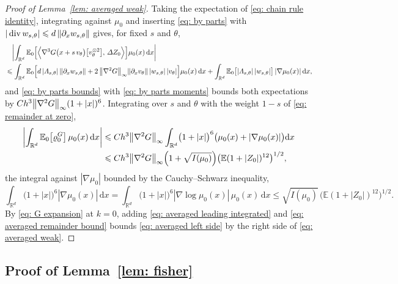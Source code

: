 \documentclass[namedate,webpdf,imanum]{ima-authoring-template}
\newcommand{\Le}{\leqslant}
\newcommand{\D}{\mathrm{d}}
\theoremstyle{thmstyletwo}
\numberwithin{equation}{section}
\begin{document}
\begin{proof}[Proof of Lemma~\ref{lem: averaged weak}]
    Taking the expectation of \eqref{eq: chain rule identity}, integrating against $\mu_0$ and inserting \eqref{eq: by parts} with $|\operatorname{div} w_{s,\theta}| \Le d\, \norm{\partial_x w_{s,\theta}}$ gives, for fixed $s$ and $\theta$,
    \begin{align*}
        & \quad \biggl| \int_{\mathbb R^d} \mathbb E_0 \Bigl[ \Bigl\langle \nabla^3 G\bigl( x + s\, v_\theta \bigr) \bigl[ v_\theta^{\otimes 2} \bigr] ,\, \Delta Z_0 \Bigr\rangle \Bigr] \mu_0(x)\,\D x \biggr| \\
        & \Le \int_{\mathbb R^d} \mathbb E_0 \Bigl[ d\, |\Lambda_{s,\theta}|\, \norm{\partial_x w_{s,\theta}} + 2\, \norm{\nabla^2 G}_\infty \norm{\partial_x v_\theta}\, |w_{s,\theta}|\, |v_\theta| \Bigr] \mu_0(x)\,\D x
        + \int_{\mathbb R^d} \mathbb E_0 \bigl[ |\Lambda_{s,\theta}|\, |w_{s,\theta}| \bigr]\, |\nabla \mu_0(x)|\,\D x ,
    \end{align*}
    and \eqref{eq: by parts bounds} with \eqref{eq: by parts moments} bounds both expectations by $C h^3 \norm{\nabla^2 G}_\infty ( 1 + |x| )^6$. Integrating over $s$ and $\theta$ with the weight $1 - s$ of \eqref{eq: remainder at zero},
    \begin{align}
        \biggl| \int_{\mathbb R^d} \mathbb E_0 \bigl[ \varrho_0^G \bigr]\, \mu_0(x)\,\D x \biggr|
        & \Le C h^3 \norm{\nabla^2 G}_\infty \int_{\mathbb R^d} \bigl( 1 + |x| \bigr)^6 \bigl( \mu_0(x) + |\nabla \mu_0(x)| \bigr) \D x \notag \\
        & \Le C h^3 \norm{\nabla^2 G}_\infty \Bigl( 1 + \sqrt{I(\mu_0)} \Bigr) \bigl( \mathbb E ( 1 + |Z_0| )^{12} \bigr)^{1/2} ,
        \label{eq: averaged remainder bound}
    \end{align}
    the integral against $|\nabla \mu_0|$ bounded by the Cauchy--Schwarz inequality,
    \begin{equation*}
        \int_{\mathbb R^d} \bigl( 1 + |x| \bigr)^6 |\nabla \mu_0(x)|\,\D x = \int_{\mathbb R^d} \bigl( 1 + |x| \bigr)^6 |\nabla \log \mu_0(x)|\, \mu_0(x)\,\D x \Le \sqrt{I(\mu_0)}\, \bigl( \mathbb E ( 1 + |Z_0| )^{12} \bigr)^{1/2} .
    \end{equation*}
    By \eqref{eq: G expansion} at $k = 0$, adding \eqref{eq: averaged leading integrated} and \eqref{eq: averaged remainder bound} bounds \eqref{eq: averaged left side} by the right side of \eqref{eq: averaged weak}.
\end{proof}

\subsection{Proof of Lemma~\ref{lem: fisher}}
\label{sec: fisher proof}
\end{document}
